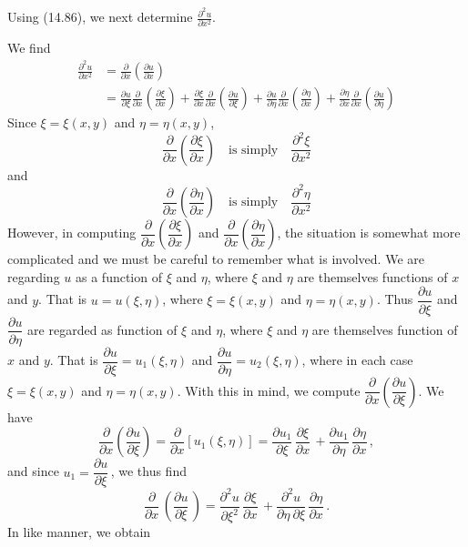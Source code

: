 \documentclass[11pt,a4paper, twoside]{report}
\newcommand{\pf}[2]{\dfrac{\partial #1}{\partial #2}\,}
\newcommand{\pfn}[3]{\dfrac{\partial^#3 #1}{\partial #2^#3}\,}
\newcommand{\pfp}[4]{\dfrac{\partial^#4 #1}{\partial #2\ \partial #3}\,}
\begin{document}
	Using (14.86), we next determine $\frac{\partial^2 u}{\partial x^2}$.\par
	We find
	\begin{equation}\tag{14.88}
		\begin{aligned}
			\frac{\partial^2 u}{\partial x^2}
			&= \frac{\partial }{\partial x}\left(\frac{\partial u}{\partial x}\right)\\
			&= \frac{\partial u}{\partial \xi}\frac{\partial}{\partial x}\left(\frac{\partial \xi}{\partial x}\right) + \frac{\partial \xi}{\partial x}\frac{\partial}{\partial x}\left(\frac{\partial u}{\partial \xi}\right) + \frac{\partial u}{\partial \eta}\frac{\partial}{\partial x}\left(\frac{\partial \eta}{\partial x}\right) + \frac{\partial \eta}{\partial x}\frac{\partial}{\partial x}\left(\frac{\partial u}{\partial \eta}\right)
		\end{aligned}
	\end{equation}
	Since $\xi = \xi(x,y)$ and $\eta = \eta (x,y)$,
	$$
	\frac{\partial }{\partial x}\left(\frac{\partial \xi}{\partial x}\right)\quad \text{is simply}\quad \frac{\partial^2 \xi}{\partial x^2}
	$$
	and
	$$
	\frac{\partial }{\partial x}\left(\frac{\partial \eta}{\partial x}\right)\quad \text{is simply}\quad \frac{\partial^2 \eta}{\partial x^2}
	$$
	However, in computing $\dfrac{\partial }{\partial x}\left(\dfrac{\partial \xi}{\partial x}\right)$ and $\dfrac{\partial }{\partial x}\left(\dfrac{\partial \eta}{\partial x}\right)$, the situation is somewhat more complicated and we must be careful to remember what is involved. We are regarding $u$ as a function of $\xi$ and $\eta$, where $\xi$ and $\eta$ are themselves functions of $x$ and $y$. That is $u = u(\xi, \eta)$, where $\xi = \xi(x,y)$ and $\eta = \eta(x,y)$. Thus $\dfrac{\partial u}{\partial \xi}$ and $\dfrac{\partial u}{\partial \eta}$ are regarded as function of $\xi$ and $\eta$, where $\xi$ and $\eta$ are themselves function of $x$ and $y$. That is $\dfrac{\partial u}{\partial \xi} = u_1(\xi, \eta)$ and $\dfrac{\partial u}{\partial \eta} = u_2(\xi, \eta)$, where in each case $\xi = \xi(x, y)$ and $\eta = \eta(x,y)$. With this in mind, we compute $\dfrac{\partial }{\partial x}\left(\dfrac{\partial u}{\partial \xi}\right)$. We have
	$$
	\frac{\partial }{\partial x}\left(\frac{\partial u}{\partial \xi}\right) = \frac{\partial}{\partial x}[u_1(\xi, \eta)] = \pf{u_1}{\xi}\pf{\xi}{x} + \pf{u_1}{\eta}\pf{\eta}{x},
	$$
	and since $u_1 = \pf{u}{\xi}$, we thus find
	$$
	\pf{}{x}\left(\pf{u}{\xi}\right) = \pfn{u}{\xi}{2}\pf{\xi}{x} + \pfp{u}{\eta}{\xi}{2}\pf{\eta}{x}.
	$$
	In like manner, we obtain
\end{document}
